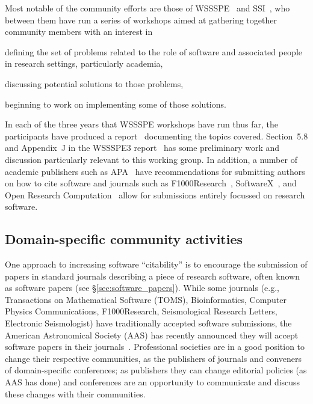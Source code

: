 \documentclass[11pt, oneside]{amsart}
\begin{document}
Most notable of the community efforts are those of WSSSPE~\cite{wssspe} and
SSI~\cite{ssi-workshops}, who between them have run a series of workshops aimed
at gathering together community members with an interest in
\begin{enumerate*}[series=InlineList, before=\hspace{-0.6ex}]
    \item defining the set
of problems related to the role of software and associated people in research
settings, particularly academia,
    \item discussing potential solutions to those
problems,
\item beginning to work on implementing some of those solutions.
  \end{enumerate*}
In each of the three years that WSSSPE workshops have run thus far, the
participants have produced a report~\cite{WSSSPE1,WSSSPE2,WSSSPE3} documenting
the topics covered. Section~5.8 and Appendix~J in the WSSSPE3
report~\cite{WSSSPE3} has some preliminary work and discussion particularly
relevant to this working group.  In addition, a number of academic publishers
such as APA~\cite{APA-guidelines} have recommendations for submitting authors on
how to cite software and journals such as F1000Research~\cite{F1000},
SoftwareX~\cite{softwareX}, and Open Research Computation~\cite{ORC} allow
for submissions entirely focussed on research software.

\subsection{Domain-specific community activities}

One approach to increasing software ``citability'' is to encourage the
submission of papers in standard journals describing a piece of research
software, often known as software papers (see \S\ref{sec:software_papers}).
While some journals (e.g., Transactions on Mathematical Software (TOMS),
Bioinformatics, Computer Physics Communications, F1000Research, 
Seismological Research Letters, Electronic Seismologist) have
traditionally accepted software submissions, the American Astronomical Society
(AAS) has recently announced they will accept software papers in their
journals~\cite{aas-sofware-papers}. Professional societies are in a good
position to change their respective communities, as the publishers of journals
and conveners of domain-specific conferences; as publishers they can change
editorial policies (as AAS has done) and conferences are an opportunity to
communicate and discuss these changes with their communities.
\end{document}
